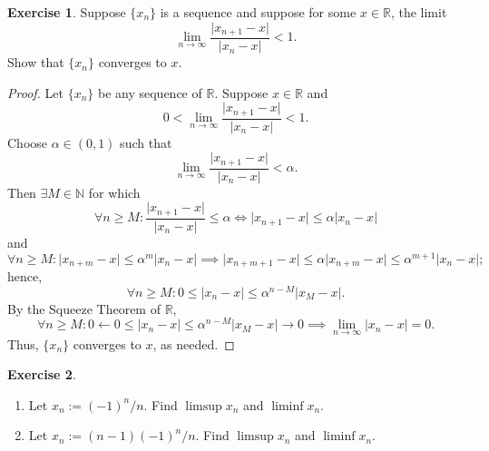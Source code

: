 \documentclass[12pt]{article}
\theoremstyle{definition}
\newtheorem{exercise}{Exercise}
\begin{document}
\thispagestyle{firstpage}

\begin{exercise}
    Suppose $\{x_n\}$ is a sequence and suppose for some $x \in \mathbb{R}$, the limit
    \[
        \lim_{n \to \infty}\frac{\vert x_{n + 1} - x \vert}{\vert x_n - x \vert} < 1.
    \]
    Show that $\{x_n\}$ converges to $x$.
\end{exercise}

\begin{proof}
    Let $\{x_n\}$ be any sequence of $\mathbb{R}$. Suppose $x \in \mathbb{R}$ and 
    \[
        0 < \lim_{n \to \infty}\frac{\vert x_{n + 1} - x \vert}{\vert x_n - x \vert} < 1.
    \]
    Choose $\alpha \in (0, 1)$ such that
    \[
        \lim_{n \to \infty}\frac{\vert x_{n + 1} - x \vert}{\vert x_n - x \vert} < \alpha.
    \]
    Then $\exists M \in \mathbb{N}$ for which
    \[
        \forall n \geq M : \frac{\vert x_{n + 1} - x \vert}{\vert x_n - x \vert} \leq \alpha \iff \vert x_{n + 1} - x \vert \leq \alpha \vert x_n - x \vert
    \]
    and
    \[
        \forall n \geq M : \vert x_{n + m} - x \vert \leq \alpha^m \vert x_n - x \vert \implies \vert x_{n + m + 1} - x \vert \leq \alpha \vert x_{n + m} - x \vert \leq \alpha^{m + 1} \vert x_n - x \vert;
    \]
    hence,
    \[
        \forall n \geq M : 0 \leq \vert x_n - x \vert \leq \alpha^{n - M} \vert x_M - x \vert.
    \]
    By the Squeeze Theorem of $\mathbb{R}$,
    \[
        \forall n \geq M : 0 \leftarrow 0 \leq \vert x_n - x \vert \leq \alpha^{n - M} \vert x_M - x \vert \to 0 \implies \lim_{n \to \infty}\vert x_n - x \vert = 0.
    \]
    Thus, $\{x_n\}$ converges to $x$, as needed.
\end{proof}

\begin{exercise}
    \hfill
    \begin{enumerate}[label=\alph*)]
        \item Let $x_n := (-1)^n / n$. Find $\limsup x_n$ and $\liminf x_n$.
        \item Let $x_n := (n-1)(-1)^n/n$. Find $\limsup x_n$ and $\liminf x_n$.
    \end{enumerate}
\end{exercise}
\end{document}
